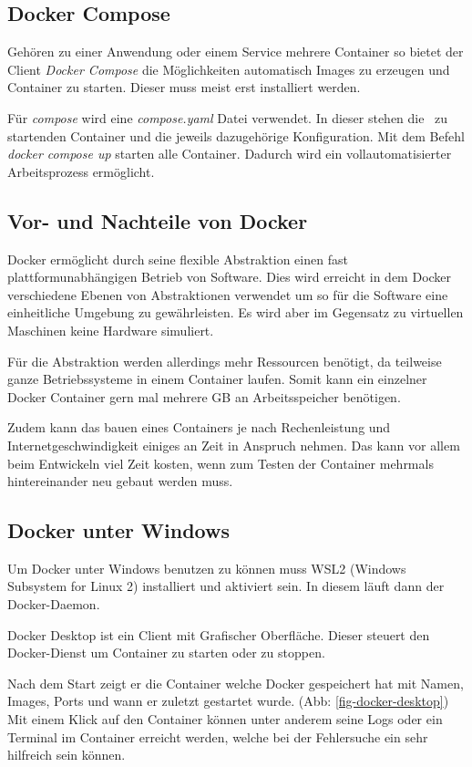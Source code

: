 
\subsection{Docker Compose }
Gehören zu einer Anwendung oder einem Service mehrere Container so bietet der Client \emph{Docker Compose} die Möglichkeiten automatisch Images zu erzeugen und Container zu starten. Dieser muss meist erst installiert werden.

Für \emph{compose} wird eine \emph{compose.yaml} Datei verwendet. In dieser stehen die  zu startenden Container und die jeweils dazugehörige Konfiguration.
Mit dem Befehl \emph{docker compose up} starten alle Container.
Dadurch wird ein vollautomatisierter Arbeitsprozess ermöglicht.

\subsection{Vor- und Nachteile von Docker }
Docker ermöglicht durch seine flexible Abstraktion einen fast plattformunabhängigen Betrieb von Software. Dies wird erreicht in dem Docker verschiedene Ebenen von Abstraktionen verwendet um so für die Software eine einheitliche Umgebung zu gewährleisten. Es wird aber im Gegensatz zu virtuellen Maschinen keine Hardware simuliert.

Für die Abstraktion werden allerdings mehr Ressourcen benötigt, da teilweise ganze Betriebssysteme in einem Container laufen. Somit kann ein einzelner Docker Container gern mal mehrere GB an Arbeitsspeicher benötigen.

Zudem kann das bauen eines Containers je nach Rechenleistung und Internetgeschwindigkeit einiges an Zeit in Anspruch nehmen. Das kann vor allem beim Entwickeln viel Zeit kosten, wenn zum Testen der Container mehrmals hintereinander neu gebaut werden muss.

\subsection{Docker unter Windows }
Um Docker unter Windows benutzen zu können muss WSL2 (Windows Subsystem for Linux 2) installiert und aktiviert sein.
In diesem läuft dann der Docker-Daemon.

Docker Desktop ist ein Client mit Grafischer Oberfläche. Dieser steuert den Docker-Dienst um Container zu starten oder zu stoppen.

Nach dem Start zeigt er die Container welche Docker gespeichert hat mit Namen, Images, Ports und wann er zuletzt gestartet wurde. (Abb: \ref{fig-docker-desktop})
Mit einem Klick auf den Container können unter anderem seine Logs oder ein Terminal im Container erreicht werden, welche bei der Fehlersuche ein sehr hilfreich sein können.

